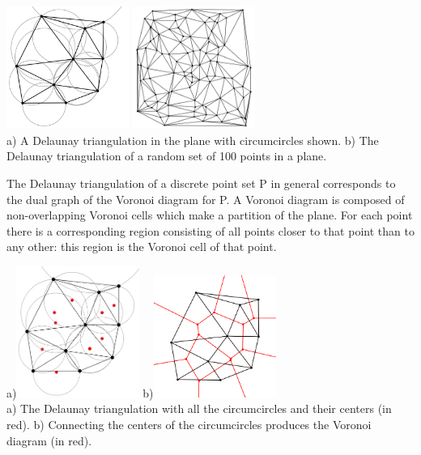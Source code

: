 \begin{center}
\includegraphics[width=4cm]{images/meshes/delaunay}
\includegraphics[width=4cm]{images/meshes/delaunay3}\\
{\captionfont a) A Delaunay triangulation in the plane with circumcircles shown.
b) The Delaunay triangulation of a random set of 100 points in a plane.}
\end{center}

The Delaunay triangulation of a discrete point set P in general corresponds 
to the dual graph of the Voronoi diagram for P. 
A Voronoi diagram is composed of non-overlapping Voronoi cells which make a partition 
of the plane. 
For each point there is a corresponding region consisting of all points closer to that 
point than to any other: this region is the Voronoi cell of that point.

\begin{center}
a)\includegraphics[width=4cm]{images/meshes/delaunay2}
b)\includegraphics[width=4cm]{images/meshes/voronoi}\\
{\captionfont a) The Delaunay triangulation with all the circumcircles and their centers (in red).
b) Connecting the centers of the circumcircles produces the Voronoi diagram (in red). }
\end{center}

